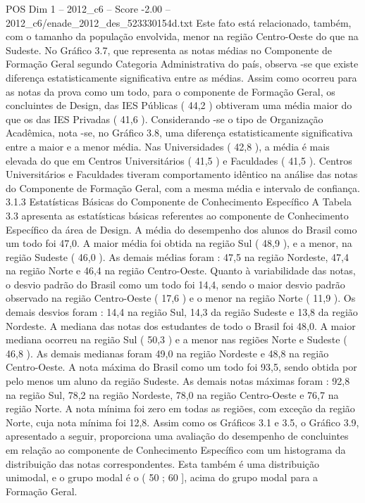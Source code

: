 \begin{textsample}{POS Dim 1 – 2012\_c6 – Score -2.00 – 2012\_c6/enade\_2012\_des\_523330154d.txt}
Este fato está relacionado, também, com o tamanho da população envolvida, menor na região Centro-Oeste do que na Sudeste.
No Gráfico 3.7, que representa as notas médias no Componente de Formação Geral segundo Categoria Administrativa do país, observa -se que existe diferença estatisticamente significativa entre as médias.
Assim como ocorreu para as notas da prova como um todo, para o componente de Formação Geral, os concluintes de Design, das IES Públicas ( 44,2 ) obtiveram uma média maior do que os das IES Privadas ( 41,6 ).
Considerando -se o tipo de Organização Acadêmica, nota -se, no Gráfico 3.8, uma diferença estatisticamente significativa entre a maior e a menor média.
Nas Universidades ( 42,8 ), a média é mais elevada do que em Centros Universitários ( 41,5 ) e Faculdades ( 41,5 ).
Centros Universitários e Faculdades tiveram comportamento idêntico na análise das notas do Componente de Formação Geral, com a mesma média e intervalo de confiança. 3.1.3 Estatísticas Básicas do Componente de Conhecimento Específico A Tabela 3.3 apresenta as estatísticas básicas referentes ao componente de Conhecimento Específico da área de Design.
A média do desempenho dos alunos do Brasil como um todo foi 47,0.
A maior média foi obtida na região Sul ( 48,9 ), e a menor, na região Sudeste ( 46,0 ).
As demais médias foram : 47,5 na região Nordeste, 47,4 na região Norte e 46,4 na região Centro-Oeste.
Quanto à variabilidade das notas, o desvio padrão do Brasil como um todo foi 14,4, sendo o maior desvio padrão observado na região Centro-Oeste ( 17,6 ) e o menor na região Norte ( 11,9 ).
Os demais desvios foram : 14,4 na região Sul, 14,3 da região Sudeste e 13,8 da região Nordeste.
A mediana das notas dos estudantes de todo o Brasil foi 48,0.
A maior mediana ocorreu na região Sul ( 50,3 ) e a menor nas regiões Norte e Sudeste ( 46,8 ).
As demais medianas foram 49,0 na região Nordeste e 48,8 na região Centro-Oeste.
A nota máxima do Brasil como um todo foi 93,5, sendo obtida por pelo menos um aluno da região Sudeste.
As demais notas máximas foram : 92,8 na região Sul, 78,2 na região Nordeste, 78,0 na região Centro-Oeste e 76,7 na região Norte.
A nota mínima foi zero em todas as regiões, com exceção da região Norte, cuja nota mínima foi 12,8.
Assim como os Gráficos 3.1 e 3.5, o Gráfico 3.9, apresentado a seguir, proporciona uma avaliação do desempenho de concluintes em relação ao componente de Conhecimento Específico com um histograma da distribuição das notas correspondentes.
Esta também é uma distribuição unimodal, e o grupo modal é o ( 50 ; 60 ], acima do grupo modal para a Formação Geral.

\end{textsample}

